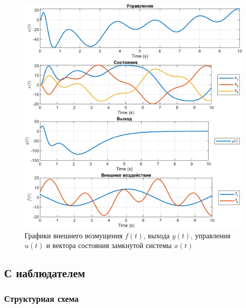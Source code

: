 \begin{figure}[H]
    \centering
    \includegraphics[width=\linewidth]{figs/2_0_sim.png}
    \caption{Графики  внешнего возмущения $f(t)$, выхода
    $y(t)$, управления $u(t)$ и вектора состояния замкнутой системы $x(t)$}
    \label{fig:2_0_sim}
\end{figure}



\subsection{С наблюдателем}

\subsubsection{Структурная схема}

